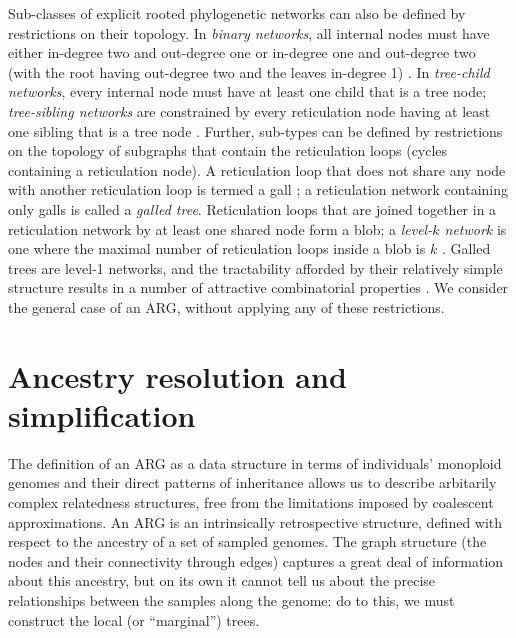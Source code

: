 \documentclass{article}
\begin{document}
Sub-classes of explicit rooted phylogenetic networks can also be defined by restrictions on their topology.
In \emph{binary networks}, all internal nodes must have either in-degree two and out-degree one or in-degree
one and out-degree two (with the root having out-degree two and the leaves in-degree 1) \citep{steel2016phylogeny}.
In \emph{tree-child networks}, every internal node must have at least one child that is a tree node;
\emph{tree-sibling networks} are constrained by every reticulation node having at least one sibling that is a
tree node \citep{cardona2008extended}. Further, sub-types can be defined by restrictions on
the topology of subgraphs that contain the reticulation loops (cycles containing a reticulation node).
A reticulation loop that does not share any node with another reticulation loop is termed a gall
\citep[][p.\ 237]{gusfield2014recombinatorics}; a reticulation network containing only galls is
called a \emph{galled tree}. Reticulation loops that are joined together in a reticulation network
by at least one shared node form a blob; a \emph{level-$k$ network} is one where the maximal number
of reticulation loops inside a blob is $k$ \citep{choy2005computing}. Galled trees are level-1 networks,
and the tractability afforded by their relatively simple structure results in a number of attractive
combinatorial properties \citep{wang2001perfect, gusfield2004optimal}. We consider the general case of
an ARG, without applying any of these restrictions.



\section*{Ancestry resolution and simplification}
The definition of an ARG as a data structure in terms of
individuals' monoploid genomes
and their direct patterns of inheritance allows us to describe arbitarily
complex relatedness structures, free from the limitations imposed by
coalescent approximations.
An ARG is an intrinsically retrospective
structure, defined with respect to the ancestry of
a set of sampled genomes.
The graph structure (the nodes and their connectivity through edges)
captures a great deal of information about this ancestry,
but on its own it cannot tell us about the precise relationships between
the samples along the genome: do to this, we must construct the
local (or ``marginal'') trees.
\end{document}
